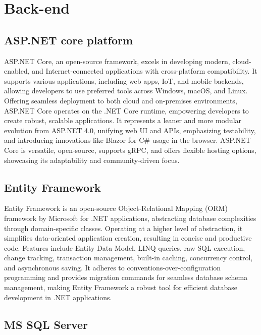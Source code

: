 \section{Back-end}
\subsection{ASP.NET core platform}

ASP.NET Core, an open-source framework, excels in developing modern,
cloud-enabled, and Internet-connected applications with cross-platform
compatibility. It supports various applications, including web apps,
IoT, and mobile backends, allowing developers to use preferred tools
across Windows, macOS, and Linux. Offering seamless deployment to both
cloud and on-premises environments, ASP.NET Core operates on the .NET
Core runtime, empowering developers to create robust, scalable
applications. It represents a leaner and more modular evolution from
ASP.NET 4.0, unifying web UI and APIs, emphasizing testability, and
introducing innovations like Blazor for C\# usage in the browser.
ASP.NET Core is versatile, open-source, supports gRPC, and offers
flexible hosting options, showcasing its adaptability and
community-driven focus.

\subsection{Entity Framework}

Entity Framework is an open-source Object-Relational Mapping (ORM) 
framework by Microsoft for .NET applications, abstracting database
complexities through domain-specific classes. Operating at a higher
level of abstraction, it simplifies data-oriented application creation,
resulting in concise and productive code. Features include Entity Data
Model, LINQ queries, raw SQL execution, change tracking, transaction
management, built-in caching, concurrency control, and asynchronous
saving. It adheres to conventions-over-configuration programming and
provides migration commands for seamless database schema management,
making Entity Framework a robust tool for efficient database development
in .NET applications.


\subsection{MS SQL Server}

